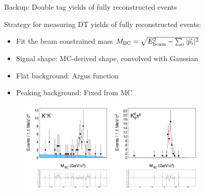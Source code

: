 \documentclass{beamer}
\begin{document}
\begin{frame}{Backup: Double tag yields of fully reconstructed events}
  \begin{center}
    Strategy for measuring DT yields of fully reconstructed events:
  \end{center}
  \begin{itemize}
    \setlength\itemsep{0.5em}
    \item{Fit the beam constrained mass $M_{\rm BC} = \sqrt{E_{\rm beam}^2 - \sum_i|\vec{p}_i|^2}$}
    \item{Signal shape: MC-derived shape, convolved with Gaussian}
    \item{Flat background: Argus function}
    \item{Peaking background: Fixed from MC}
  \end{itemize}
  \begin{figure}
    \includegraphics[width = 0.4\textwidth,trim={0 14cm 0 0},clip=true]{Plots/DoubleTagYield_DoubleTag_CP_KKpipi_vs_KK_SignalBin0.png}
    \includegraphics[width = 0.4\textwidth,trim={0 14cm 0 0},clip=true]{Plots/DoubleTagYield_DoubleTag_CP_KKpipi_vs_KSpi0_SignalBin0.png}
  \end{figure}
\end{frame}
    
\end{document}
